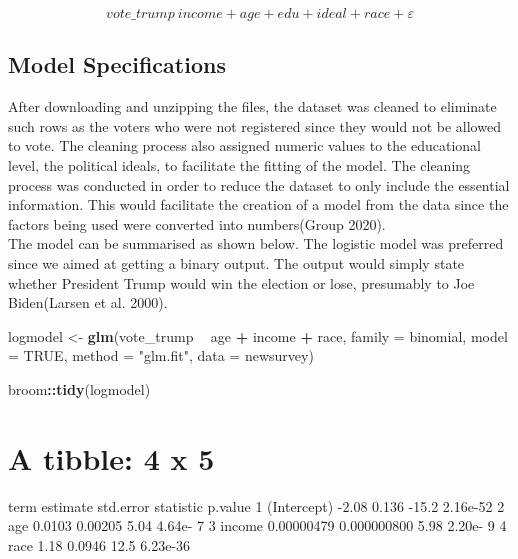 \documentclass[
  12pt,
]{article}
\newenvironment{Shaded}{\begin{snugshade}}{\end{snugshade}}
\newcommand{\DataTypeTok}[1]{\textcolor[rgb]{0.13,0.29,0.53}{#1}}
\newcommand{\KeywordTok}[1]{\textcolor[rgb]{0.13,0.29,0.53}{\textbf{#1}}}
\newcommand{\NormalTok}[1]{#1}
\newcommand{\OperatorTok}[1]{\textcolor[rgb]{0.81,0.36,0.00}{\textbf{#1}}}
\newcommand{\OtherTok}[1]{\textcolor[rgb]{0.56,0.35,0.01}{#1}}
\newcommand{\StringTok}[1]{\textcolor[rgb]{0.31,0.60,0.02}{#1}}
\begin{document}
\[vote\_trump ~ income + age + edu + ideal + race + \varepsilon\]

\hypertarget{model-specifications}{%
\subsection{Model Specifications}\label{model-specifications}}

After downloading and unzipping the files, the dataset was cleaned to
eliminate such rows as the voters who were not registered since they
would not be allowed to vote. The cleaning process also assigned numeric
values to the educational level, the political ideals, to facilitate the
fitting of the model. The cleaning process was conducted in order to
reduce the dataset to only include the essential information. This would
facilitate the creation of a model from the data since the factors being
used were converted into numbers(Group 2020).\\
The model can be summarised as shown below. The logistic model was
preferred since we aimed at getting a binary output. The output would
simply state whether President Trump would win the election or lose,
presumably to Joe Biden(Larsen et al. 2000).

\begin{Shaded}
\begin{Highlighting}[]
\NormalTok{logmodel <-}\StringTok{ }\KeywordTok{glm}\NormalTok{(vote_trump }\OperatorTok{~}\StringTok{ }\NormalTok{age }\OperatorTok{+}\StringTok{ }\NormalTok{income }\OperatorTok{+}\StringTok{ }\NormalTok{race, }\DataTypeTok{family =}\NormalTok{ binomial, }
             \DataTypeTok{model =} \OtherTok{TRUE}\NormalTok{, }\DataTypeTok{method =} \StringTok{"glm.fit"}\NormalTok{, }\DataTypeTok{data =}\NormalTok{ newsurvey)}

\NormalTok{broom}\OperatorTok{::}\KeywordTok{tidy}\NormalTok{(logmodel)}
\end{Highlighting}
\end{Shaded}

\hypertarget{a-tibble-4-x-5}{%
\section{A tibble: 4 x 5}\label{a-tibble-4-x-5}}

term estimate std.error statistic p.value 1 (Intercept) -2.08 0.136
-15.2 2.16e-52 2 age 0.0103 0.00205 5.04 4.64e- 7 3 income 0.00000479
0.000000800 5.98 2.20e- 9 4 race 1.18 0.0946 12.5 6.23e-36
\end{document}
